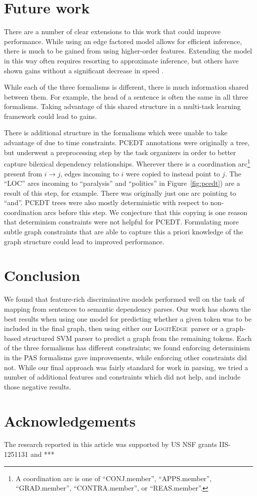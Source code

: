 \documentclass[11pt]{article}
\newcommand{\logitedge}{\textsc{LogitEdge}}
\begin{document}
\section{Future work}

There are a number of clear extensions to this work that could improve
performance.
While using an edge factored model allows for efficient inference, there is
much to be gained from using higher-order features.
Extending the model in this way often requires resorting to approximate
inference, but others have shown gains without a significant decrease in
speed \cite{mcdonald_online_2006,martins_turning_2013}.

While each of the three formalisms is different, there is much information
shared between them.
For example, the head of a sentence is often the same in all three formalisms.
Taking advantage of this shared structure in a multi-task learning framework
could lead to gains.

There is additional structure in the formalisms which were unable to take
advantage of due to time constraints.
PCEDT annotations were originally a tree, but underwent a preprocessing step by
the task organizers in order to better capture bilexical dependency
relationships.
Wherever there is a coordination arc\footnote{A coordination arc
is one of ``CONJ.member'', ``APPS.member'', ``GRAD.member'', ``CONTRA.member'',
or ``REAS.member''.} present from $i \rightarrow j$, edges incoming to $i$ were
copied to instead point to $j$.
The ``LOC'' arcs incoming to ``paralysis'' and ``politics'' in
Figure~\ref{fig:pcedt}) are a result of this step, for example.
There was originally just one arc pointing to ``and''.
PCEDT trees were also mostly deterministic with respect to non-coordination arcs
before this step.
We conjecture that this copying is one reason that determinism constraints were
not helpful for PCEDT.
Formulating more subtle graph constraints that are able to capture this a priori
knowledge of the graph structure could lead to improved performance.


\section{Conclusion}
We found that feature-rich discriminative models performed well on the task of
mapping from sentences to semantic dependency parses.
Our work has shown the best results when using one model for predicting whether
a given token was to be included in the final graph, then using either our
\logitedge\ parser or a graph-based structured SVM parser to predict a graph
from the remaining tokens.
Each of the three formalisms has different constraints;
we found enforcing determinism in the PAS formalisms gave improvements, while
enforcing other constraints did not.
While our final approach was fairly standard for work in parsing, we tried a
number of additional features and constraints which did not help, and include
those negative results.



\section*{Acknowledgements}
The research reported in this article was supported by US NSF grants IIS-1251131 and ***




\end{document}

